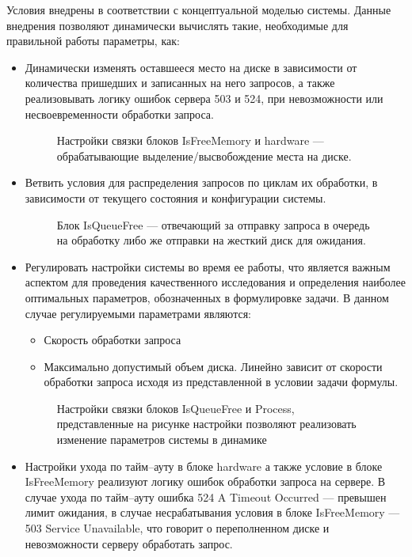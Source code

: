 Условия внедрены в соответствии с концептуальной моделью системы. Данные внедрения
позволяют динамически вычислять такие, необходимые для правильной работы параметры,
как:
\begin{itemize}
    \item Динамически изменять оставшееся место на диске в зависимости от количества
    пришедших и записанных на него запросов, а также реализовывать логику
    ошибок сервера 503 и 524, при невозможности или несвоевременности
    обработки запроса.
    \begin{figure} [h]
        \caption{Настройки связки блоков IsFreeMemory и hardware ---
        обрабатывающие выделение/высвобождение места на диске.}
    \end{figure}
    \item Ветвить условия для распределения запросов по циклам их обработки, в зависимости
    от текущего состояния и конфигурации системы.
    \begin{figure} [h]
        \caption{Блок IsQueueFree --- отвечающий за отправку запроса в очередь
        на обработку либо же отправки на жесткий диск для ожидания.}
    \end{figure}

    \item Регулировать настройки системы во время ее работы, что является важным
    аспектом для проведения качественного исследования и определения наиболее оптимальных
    параметров, обозначенных в формулировке задачи. В данном случае регулируемыми
    параметрами являются:
    \begin{itemize}
        \item Скорость обработки запроса
        \item Максимально допустимый объем диска. Линейно зависит от скорости обработки
        запроса исходя из представленной в условии задачи формулы.
    \end{itemize}

    \begin{figure} [h]
        \caption{Настройки связки блоков IsQueueFree и Process,
        представленные на рисунке настройки позволяют реализовать
        изменение параметров системы в динамике}
    \end{figure}

    \item Настройки ухода по тайм--ауту в блоке hardware а также условие в блоке
    IsFreeMemory реализуют логику ошибок обработки запроса на сервере. В случае
    ухода по тайм--ауту ошибка 524 A Timeout Occurred --- превышен лимит ожидания,
    в случае несрабатывания условия в блоке IsFreeMemory --- 503 Service Unavailable,
    что говорит о переполненном диске и невозможности серверу обработать запрос.


\end{itemize}
